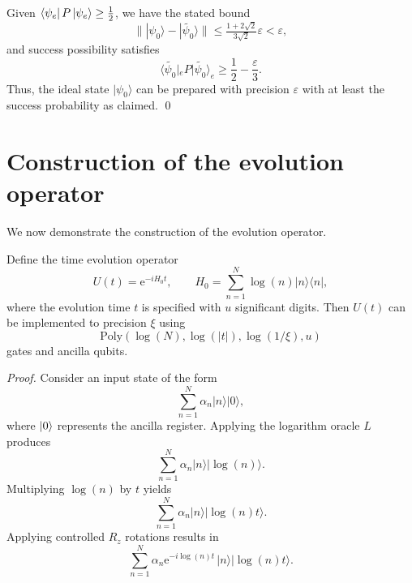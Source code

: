\documentclass[aps,pra,twocolumn,superscriptaddress,preprintnumbers,amsmath,amssymb]{revtex4-2}
\begin{document}
  Given $\bra{\psi_e} P \ket{\psi_e} \geq \frac{1}{2}$, we have the stated bound
  \begin{equation}
      \||\psi_0\rangle-|\widetilde{\psi_0}\rangle\|\leq \tfrac{1+2\sqrt{2}}{3\sqrt{2}}\varepsilon<\varepsilon,
  \end{equation}
  and success possibility satisfies 
  \begin{equation}
      \langle\widetilde{\psi_0}|_e P |\widetilde{\psi_0}\rangle_e\geq\frac{1}{2}-\frac{\varepsilon}{3}.
  \end{equation}
Thus, the ideal state $|\psi_0\rangle$ can be prepared with precision $\varepsilon$ with at least the success probability as claimed. \qed
\section{Construction of the evolution operator}
We now demonstrate the construction of the evolution operator.
\begin{theorem}\label{Theorem:Hsi}
    Define the time evolution operator
    \begin{equation}
        U(t)=\mathrm{e}^{-iH_0t}, \qquad H_0=\sum_{n=1}^{N}\log(n)|n\rangle\langle n|,
    \end{equation}
    where the evolution time $t$ is specified with $u$ significant digits. Then $U(t)$ can be implemented to precision $\xi$ using 
    \begin{equation}
        \mathrm{Poly}(\log(N),\log(|t|),\log(1/\xi),u)
    \end{equation}
 gates and  ancilla qubits.
\end{theorem}
\noindent\textit{Proof.} Consider an input state of the form
\begin{equation}
    \sum_{n=1}^{N} \alpha_n |n\rangle |0\rangle,
\end{equation}
where $\ket{0}$ represents the ancilla register. Applying the logarithm oracle $L$ produces
\begin{equation}
    \sum_{n=1}^{N} \alpha_n |n\rangle |\log(n)\rangle.
\end{equation}
Multiplying $\log(n)$ by $t$ yields
\begin{equation}
    \sum_{n=1}^{N} \alpha_n |n\rangle |\log(n)t\rangle.
\end{equation}
Applying controlled $R_z$ rotations results in
\begin{equation}
    \sum_{n=1}^{N} \alpha_n \mathrm{e}^{-i\log(n)t}\,|n\rangle |\log(n)t\rangle.
\end{equation}
\end{document}

